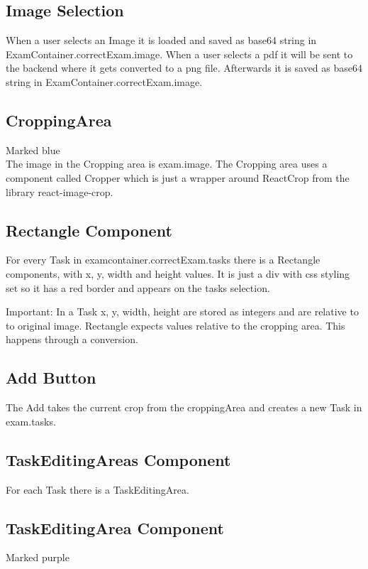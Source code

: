 \subsection{Image Selection}
When a user selects an Image it is loaded and saved as base64
string in ExamContainer.correctExam.image.
When a user selects a pdf it will be sent to the backend where it gets
converted to a png file. Afterwards it is saved as base64 string in
ExamContainer.correctExam.image.

\subsection{CroppingArea}
Marked blue\\
The image in the Cropping area is exam.image.
The Cropping area uses a component called Cropper which is just a wrapper around ReactCrop from the library react-image-crop.

\subsection{Rectangle Component}
For every Task in examcontainer.correctExam.tasks there is a
Rectangle components, with x, y, width and height values.
It is just a div with css styling set so it has a red border and appears on the tasks selection.

Important: In a Task x, y, width, height are stored as integers and are relative to to original image.
Rectangle expects values relative to the cropping area.
This happens through a conversion.

\subsection{Add Button}
The Add takes the current crop from the croppingArea and creates a new Task in exam.tasks.

\subsection{TaskEditingAreas Component}
For each Task there is a TaskEditingArea.

\newpage
\subsection{TaskEditingArea Component}
Marked purple

